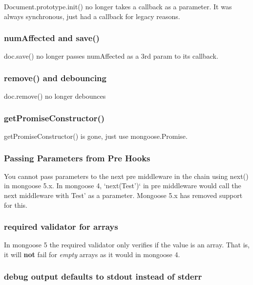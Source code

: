 {\ttfamily Document.\+prototype.\+init()} no longer takes a callback as a parameter. It was always synchronous, just had a callback for legacy reasons.

\subsubsection*{{\ttfamily num\+Affected} and {\ttfamily save()}}

{\ttfamily doc.\+save()} no longer passes {\ttfamily num\+Affected} as a 3rd param to its callback.

\subsubsection*{{\ttfamily remove()} and debouncing}

{\ttfamily doc.\+remove()} no longer debounces

\subsubsection*{{\ttfamily get\+Promise\+Constructor()}}

{\ttfamily get\+Promise\+Constructor()} is gone, just use {\ttfamily mongoose.\+Promise}.

\subsubsection*{Passing Parameters from Pre Hooks}

You cannot pass parameters to the next pre middleware in the chain using {\ttfamily next()} in mongoose 5.\+x. In mongoose 4, `next(\textquotesingle{}Test')` in pre middleware would call the next middleware with \textquotesingle{}Test' as a parameter. Mongoose 5.\+x has removed support for this.

\subsubsection*{{\ttfamily required} validator for arrays}

In mongoose 5 the {\ttfamily required} validator only verifies if the value is an array. That is, it will {\bfseries not} fail for {\itshape empty} arrays as it would in mongoose 4.

\subsubsection*{debug output defaults to stdout instead of stderr}

